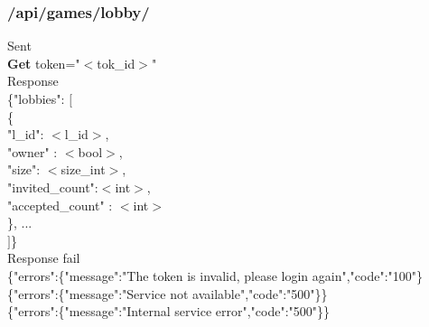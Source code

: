 \subsubsection{/api/games/lobby/}
\tab	Sent\\
\tab\tab	 \textbf{Get} token="$<$tok\_id$>$"\\
\tab	Response\\
\tab\tab	\{"lobbies": $[$\\
\tab\tab\tab	\{\\
\tab\tab\tab	"l\_id": $<$l\_id$>$, \\
\tab\tab\tab	"owner" : $<$bool$>$, \\
\tab\tab\tab	"size": $<$size\_int$>$, \\
\tab\tab\tab	"invited\_count":$<$int$>$, \\
\tab\tab\tab	"accepted\_count" : $<$int$>$\\
\tab\tab\tab	\}, ...\\
\tab\tab	$]$\}\\
\tab	Response fail\\
\tab\tab	\{"errors":\{"message":"The token is invalid, please login again","code":"100"\}\\
\tab\tab	\{"errors":\{"message":"Service not available","code":"500"\}\}\\
\tab\tab	\{"errors":\{"message":"Internal service error","code":"500"\}\}\\

